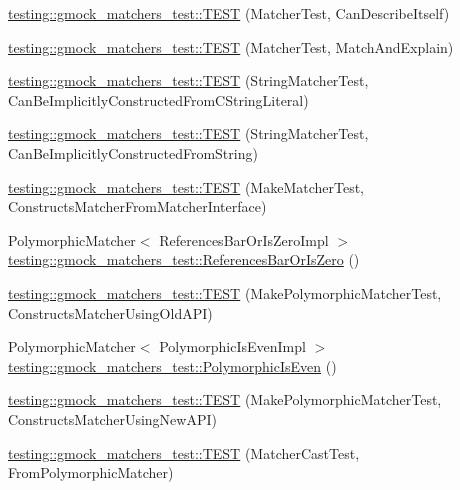 \begin{DoxyCompactItemize}
\mbox{\hyperlink{namespacetesting_1_1gmock__matchers__test_ae85f2ec21822e884ac9ff58741d420d2}{testing\+::gmock\+\_\+matchers\+\_\+test\+::\+T\+E\+ST}} (Matcher\+Test, Can\+Describe\+Itself)
\item 
\mbox{\hyperlink{namespacetesting_1_1gmock__matchers__test_aee6cef32b22ddd6ce8b87578c3de4198}{testing\+::gmock\+\_\+matchers\+\_\+test\+::\+T\+E\+ST}} (Matcher\+Test, Match\+And\+Explain)
\item 
\mbox{\hyperlink{namespacetesting_1_1gmock__matchers__test_a17fb479932a88dc4e334327c5e12c8d6}{testing\+::gmock\+\_\+matchers\+\_\+test\+::\+T\+E\+ST}} (String\+Matcher\+Test, Can\+Be\+Implicitly\+Constructed\+From\+C\+String\+Literal)
\item 
\mbox{\hyperlink{namespacetesting_1_1gmock__matchers__test_a6786eca17f1fc4d6250470cc21ec79f1}{testing\+::gmock\+\_\+matchers\+\_\+test\+::\+T\+E\+ST}} (String\+Matcher\+Test, Can\+Be\+Implicitly\+Constructed\+From\+String)
\item 
\mbox{\hyperlink{namespacetesting_1_1gmock__matchers__test_ae433e93168010d7316b40ef4a5088d09}{testing\+::gmock\+\_\+matchers\+\_\+test\+::\+T\+E\+ST}} (Make\+Matcher\+Test, Constructs\+Matcher\+From\+Matcher\+Interface)
\item 
Polymorphic\+Matcher$<$ References\+Bar\+Or\+Is\+Zero\+Impl $>$ \mbox{\hyperlink{namespacetesting_1_1gmock__matchers__test_ac07376a5dff45a905b7eb96e621ce3aa}{testing\+::gmock\+\_\+matchers\+\_\+test\+::\+References\+Bar\+Or\+Is\+Zero}} ()
\item 
\mbox{\hyperlink{namespacetesting_1_1gmock__matchers__test_aad0604e47fea147ae133d134b4606a26}{testing\+::gmock\+\_\+matchers\+\_\+test\+::\+T\+E\+ST}} (Make\+Polymorphic\+Matcher\+Test, Constructs\+Matcher\+Using\+Old\+A\+PI)
\item 
Polymorphic\+Matcher$<$ Polymorphic\+Is\+Even\+Impl $>$ \mbox{\hyperlink{namespacetesting_1_1gmock__matchers__test_a8a0035a0de2d219d89ff7070762ece72}{testing\+::gmock\+\_\+matchers\+\_\+test\+::\+Polymorphic\+Is\+Even}} ()
\item 
\mbox{\hyperlink{namespacetesting_1_1gmock__matchers__test_a619d872aa86419c5093327f64c466df3}{testing\+::gmock\+\_\+matchers\+\_\+test\+::\+T\+E\+ST}} (Make\+Polymorphic\+Matcher\+Test, Constructs\+Matcher\+Using\+New\+A\+PI)
\item 
\mbox{\hyperlink{namespacetesting_1_1gmock__matchers__test_afffaa6f2c436edb7c46e7a16ed2de825}{testing\+::gmock\+\_\+matchers\+\_\+test\+::\+T\+E\+ST}} (Matcher\+Cast\+Test, From\+Polymorphic\+Matcher)
\item 

\end{DoxyCompactItemize}
